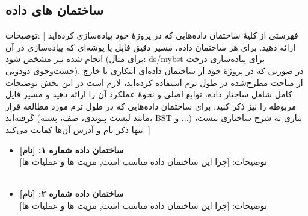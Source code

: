 \documentclass[12pt]{article}
\begin{document}
\subsection{ساختمان های داده}
توضیحات: [ فهرستی از کلیهٔ ساختمان داده‌هایی که در پروژهٔ خود پیاده‌سازی کرده‌اید ارائه دهید. برای هر ساختمان داده، مسیر دقیق فایل یا پوشه‌ای که پیاده‌سازی در آن انجام شده نیز مشخص شود (برای مثال: ds/mybst برای پیاده‌سازی درخت جست‌وجوی دودویی).
در صورتی که در پروژهٔ خود از ساختمان داده‌ای ابتکاری یا خارج از مباحث مطرح‌شده در طول ترم استفاده کرده‌اید، لازم است در این بخش توضیحات کامل شامل ساختار داده، توابع اصلی و نحوهٔ عملکرد آن را ارائه دهید و مسیر فایل مربوطه را نیز ذکر کنید.
برای ساختمان داده‌هایی که در طول ترم مورد مطالعه قرار گرفته‌اند (مانند لیست پیوندی، صف، پشته، BST و ...) نیازی به شرح ساختاری نیست، تنها ذکر نام و آدرس آن‌ها کفایت می‌کند. ]

\begin{itemize}[noitemsep]
	\item \textbf{ساختمان داده شماره ۱: [نام]}\\
	توضیحات: [چرا این ساختمان داده مناسب است, مزیت ها و عملیات ها]\\
	\lipsum[8]
	\\
	\item \textbf{ساختمان داده شماره ۲: [نام]}\\
	توضیحات: [چرا این ساختمان داده مناسب است, مزیت ها و عملیات ها]\\
	\lipsum[8]
\end{itemize}
\end{document}
